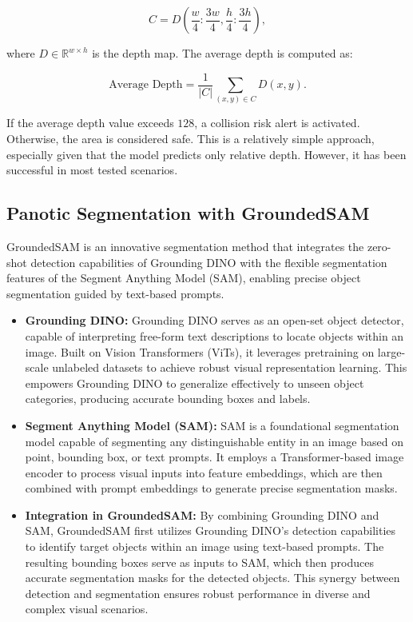 \documentclass[conference]{IEEEtran}
\begin{document}
\[
C = D\left(\frac{w}{4} : \frac{3w}{4}, \frac{h}{4} : \frac{3h}{4}\right),
\]

where \( D \in \mathbb{R}^{w \times h} \) is the depth map. The average depth is computed as: 

\[
\text{Average Depth} = \frac{1}{|C|} \sum_{(x, y) \in C} D(x, y).
\]

If the average depth value exceeds \( 128 \), a collision risk alert is activated. Otherwise, the area is considered safe. This is a relatively simple approach, especially given that the model predicts only relative depth. However, it has been successful in most tested scenarios.


\subsection{Panotic Segmentation with GroundedSAM}
GroundedSAM is an innovative segmentation method that integrates the zero-shot detection capabilities of Grounding DINO with the flexible segmentation features of the Segment Anything Model (SAM), enabling precise object segmentation guided by text-based prompts.
\begin{itemize}
    \item \textbf{Grounding DINO\cite{Grounding dino}:} Grounding DINO serves as an open-set object detector, capable of interpreting free-form text descriptions to locate objects within an image. Built on Vision Transformers (ViTs), it leverages pretraining on large-scale unlabeled datasets to achieve robust visual representation learning. This empowers Grounding DINO to generalize effectively to unseen object categories, producing accurate bounding boxes and labels.
    \item \textbf{Segment Anything Model (SAM)\cite{SAM}:} SAM is a foundational segmentation model capable of segmenting any distinguishable entity in an image based on point, bounding box, or text prompts. It employs a Transformer-based image encoder to process visual inputs into feature embeddings, which are then combined with prompt embeddings to generate precise segmentation masks.
    \item \textbf{Integration in GroundedSAM\cite{GroundedSAM}:}  By combining Grounding DINO and SAM, GroundedSAM first utilizes Grounding DINO's detection capabilities to identify target objects within an image using text-based prompts. The resulting bounding boxes serve as inputs to SAM, which then produces accurate segmentation masks for the detected objects. This synergy between detection and segmentation ensures robust performance in diverse and complex visual scenarios.
\end{itemize}
\end{document}
